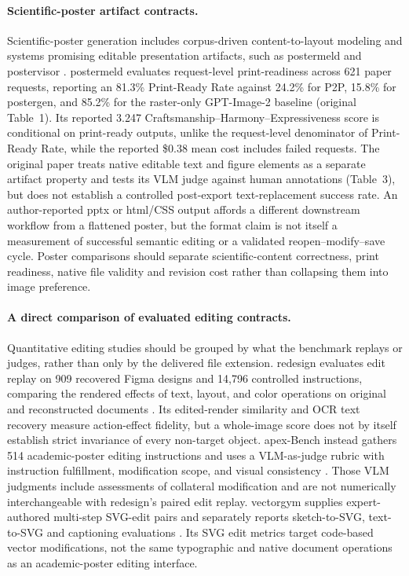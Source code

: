 \paragraph{Scientific-poster artifact contracts.}
Scientific-poster generation includes corpus-driven content-to-layout modeling \citep{zhong2025scienceposter} and systems promising editable presentation artifacts, such as \ac{postermeld} and \ac{postervisor} \citep{hu2026postermeld,li2026postervisor}.
\ac{postermeld} evaluates request-level print-readiness across 621 paper requests, reporting an 81.3\% Print-Ready Rate against 24.2\% for P2P, 15.8\% for \ac{postergen}, and 85.2\% for the raster-only GPT-Image-2 baseline (original Table~1).
Its reported 3.247 Craftsmanship--Harmony--Expressiveness score is conditional on print-ready outputs, unlike the request-level denominator of Print-Ready Rate, while the reported \$0.38 mean cost includes failed requests.
The original paper treats native editable text and figure elements as a separate artifact property and tests its VLM judge against human annotations (Table~3), but does not establish a controlled post-export text-replacement success rate.
An author-reported \ac{pptx} or \ac{html}/CSS output affords a different downstream workflow from a flattened poster, but the format claim is not itself a measurement of successful semantic editing or a validated reopen--modify--save cycle.
Poster comparisons should separate scientific-content correctness, print readiness, native file validity and revision cost rather than collapsing them into image preference.

\paragraph{A direct comparison of evaluated editing contracts.}
Quantitative editing studies should be grouped by what the benchmark replays or judges, rather than only by the delivered file extension.
\ac{redesign} evaluates edit replay on 909 recovered Figma designs and 14,796 controlled instructions, comparing the rendered effects of text, layout, and color operations on original and reconstructed documents \citep{redesign2026}.
Its edited-render similarity and OCR text recovery measure action-effect fidelity, but a whole-image score does not by itself establish strict invariance of every non-target object.
\ac{apex}-Bench instead gathers 514 academic-poster editing instructions and uses a VLM-as-judge rubric with instruction fulfillment, modification scope, and visual consistency \citep{apex2026}.
Those VLM judgments include assessments of collateral modification and are not numerically interchangeable with \ac{redesign}'s paired edit replay.
\ac{vectorgym} supplies expert-authored multi-step SVG-edit pairs and separately reports sketch-to-SVG, text-to-SVG and captioning evaluations \citep{vectorgym2026}.
Its SVG edit metrics target code-based vector modifications, not the same typographic and native document operations as an academic-poster editing interface.

